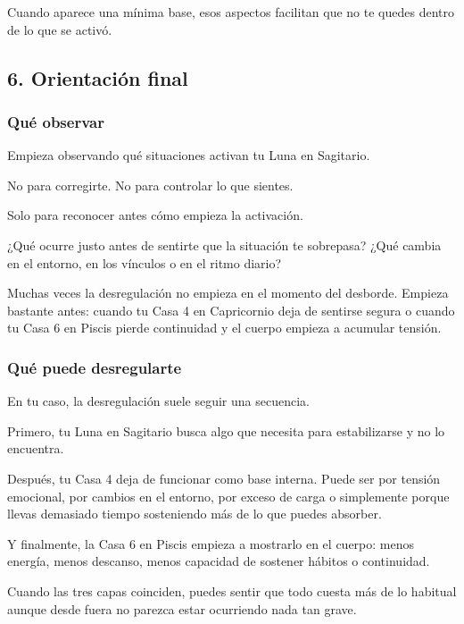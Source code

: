 \documentclass[11pt,a4paper]{article}
\begin{document}
Cuando aparece una mínima base, esos aspectos facilitan que no te quedes dentro de lo que se activó.

\vspace{0.8cm}

\subsection{6. Orientación final}

\subsubsection*{Qué observar}

Empieza observando qué situaciones activan tu Luna en Sagitario.

No para corregirte.
No para controlar lo que sientes.

Solo para reconocer antes cómo empieza la activación.

¿Qué ocurre justo antes de sentirte que la situación te sobrepasa?
¿Qué cambia en el entorno, en los vínculos o en el ritmo diario?

Muchas veces la desregulación no empieza en el momento del desborde. Empieza bastante antes: cuando tu Casa 4 en Capricornio deja de sentirse segura o cuando tu Casa 6 en Piscis pierde continuidad y el cuerpo empieza a acumular tensión.

\subsubsection*{Qué puede desregularte}

En tu caso, la desregulación suele seguir una secuencia.

Primero, tu Luna en Sagitario busca algo que necesita para estabilizarse y no lo encuentra.

Después, tu Casa 4 deja de funcionar como base interna. Puede ser por tensión emocional, por cambios en el entorno, por exceso de carga o simplemente porque llevas demasiado tiempo sosteniendo más de lo que puedes absorber.

Y finalmente, la Casa 6 en Piscis empieza a mostrarlo en el cuerpo:
menos energía,
menos descanso,
menos capacidad de sostener hábitos o continuidad.

Cuando las tres capas coinciden, puedes sentir que todo cuesta más de lo habitual aunque desde fuera no parezca estar ocurriendo nada tan grave.
\end{document}
